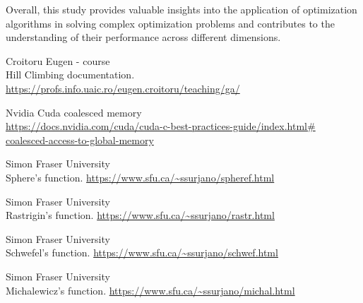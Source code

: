 \documentclass{article}
\begin{document}
Overall, this study provides valuable insights into the application of optimization algorithms in solving complex optimization problems and contributes to the understanding of their performance across different dimensions. 


\begin{thebibliography}{9}

  Croitoru Eugen - course \\ Hill Climbing documentation.
  \url{https://profs.info.uaic.ro/eugen.croitoru/teaching/ga/}

  Nvidia Cuda coalesced memory \\
  \url{https://docs.nvidia.com/cuda/cuda-c-best-practices-guide/index.html\# coalesced-access-to-global-memory}

  Simon Fraser University \\ Sphere's function.
  \url{https://www.sfu.ca/~ssurjano/spheref.html}

  Simon Fraser University \\  Rastrigin's function.
  \url{https://www.sfu.ca/~ssurjano/rastr.html}

  Simon Fraser University \\ Schwefel's function.
  \url{https://www.sfu.ca/~ssurjano/schwef.html}

  Simon Fraser University \\ Michalewicz's function.
  \url{https://www.sfu.ca/~ssurjano/michal.html}


\end{thebibliography}  
\end{document}
